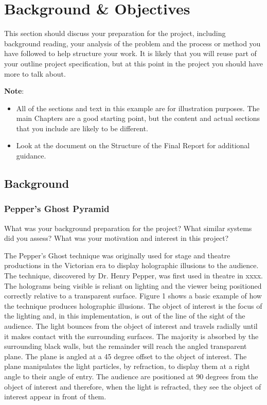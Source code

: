 \chapter{Background \& Objectives}

This section should discuss your preparation for the project, including background reading, your analysis of the problem and the process or method you have followed to help structure your work.  It is likely that you will reuse part of your outline project specification, but at this point in the project you should have more to talk about. 

\textbf{Note}: 

\begin{itemize}
   \item All of the sections and text in this example are for illustration purposes. The main Chapters are a good starting point, but the content and actual sections that you include are likely to be different.
   
   \item Look at the document on the Structure of the Final Report for additional guidance. 
   
\end {itemize}

\section{Background}
\subsection{Pepper's Ghost Pyramid}
What was your background preparation for the project? What similar systems did you assess? What was your motivation and interest in this project?

The Pepper's Ghost technique was originally used for stage and theatre productions in the Victorian era to display holographic illusions to the audience. The technique, discovered by Dr. Henry Pepper, was first used in theatre in xxxx. The holograms being visible is reliant on lighting and the viewer being positioned correctly relative to a transparent surface. Figure 1 shows a basic example of how the technique produces holographic illusions. The object of interest is the focus of the lighting and, in this implementation, is out of the line of the sight of the audience. The light bounces from the object of interest and travels radially until it makes contact with the surrounding surfaces. The majority is absorbed by the surrounding black walls, but the remainder will reach the angled transparent plane. The plane is angled at a 45 degree offset to the object of interest. The plane manipulates the light particles, by refraction, to display them at a right angle to their angle of entry. The audience are positioned at 90 degrees from the object of interest and therefore, when the light is refracted, they see the object of interest appear in front of them. 

